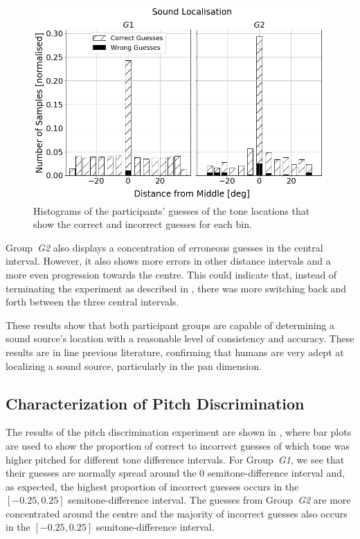 \documentclass[acmsmall]{acmart}
\begin{document}
\begin{figure}
  \centering
  \includegraphics[width=0.8\columnwidth]{figures/sound_localisation.png}
  \caption{Histograms of the participants' guesses of the tone locations that show the correct and incorrect guesses for each bin. }\label{fig:sound-localisation}
\end{figure}

Group~\textit{G2} also displays a concentration of erroneous guesses in the central interval.
However, it also shows more errors in other distance intervals and a more even progression towards the centre.
This could indicate that, instead of terminating the experiment as described in , there was more switching back and forth between the three central intervals. 

These results show that both participant groups are capable of determining a sound source's location with a reasonable level of consistency and accuracy.
These results are in line previous literature, confirming that humans are very adept at localizing a sound source, particularly in the pan dimension. 

\subsection{Characterization of Pitch Discrimination}

The results of the pitch discrimination experiment are shown in , where bar plots are used to show the proportion of correct to incorrect guesses of which tone was higher pitched for different tone difference intervals. 
For Group~\textit{G1}, we see that their guesses are normally spread around the 0 semitone-difference interval and, as expected, the highest proportion of incorrect guesses occurs in the $[-0.25, 0.25]$ semitone-difference interval. 
The guesses from Group~\textit{G2} are more concentrated around the centre and the majority of incorrect guesses also occurs in the $[-0.25, 0.25]$ semitone-difference interval.
\end{document}
